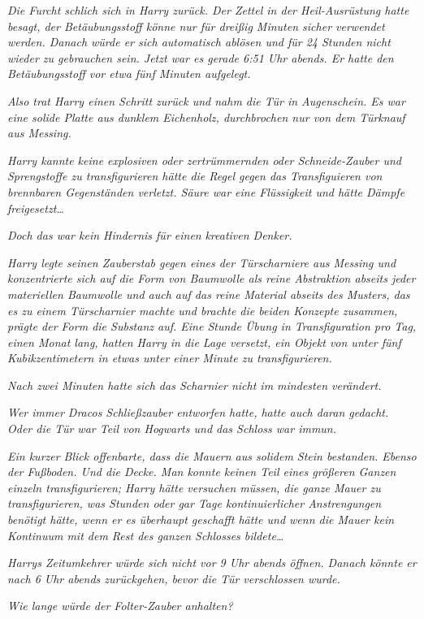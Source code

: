 {\emph{Die Furcht schlich sich in Harry zurück. Der Zettel in der Heil-Ausrüstung hatte besagt, der Betäubungsstoff könne nur für dreißig Minuten sicher verwendet werden. Danach würde er sich automatisch ablösen und für 24 Stunden nicht wieder zu gebrauchen sein. Jetzt war es gerade 6:51 Uhr abends. Er hatte den Betäubungsstoff vor etwa fünf Minuten aufgelegt.}

\emph{Also trat Harry einen Schritt zurück und nahm die Tür in Augenschein. Es war eine solide Platte aus dunklem Eichenholz, durchbrochen nur von dem Türknauf aus Messing.}

\emph{Harry kannte keine explosiven oder zertrümmernden oder Schneide-Zauber und Sprengstoffe zu transfigurieren hätte die Regel gegen das Transfiguieren von brennbaren Gegenständen verletzt. Säure war eine Flüssigkeit und hätte Dämpfe freigesetzt…}

\emph{Doch das war kein Hindernis für einen} \emph{\emph{kreativen Denker.}}

\emph{Harry legte seinen Zauberstab gegen eines der Türscharniere aus Messing und konzentrierte sich auf die Form von Baumwolle als reine Abstraktion abseits jeder materiellen Baumwolle und auch auf das reine Material abseits des Musters, das es zu einem Türscharnier machte und brachte die beiden Konzepte zusammen, prägte der Form die Substanz auf. Eine Stunde Übung in Transfiguration pro Tag, einen Monat lang, hatten Harry in die Lage versetzt, ein Objekt von unter fünf Kubikzentimetern in etwas unter einer Minute zu transfigurieren.}

\emph{Nach zwei Minuten hatte sich das Scharnier nicht im mindesten verändert.}

\emph{Wer immer Dracos Schließzauber entworfen hatte, hatte auch daran gedacht. Oder die Tür war Teil von Hogwarts und das Schloss war immun.}

\emph{Ein kurzer Blick offenbarte, dass die Mauern aus solidem Stein bestanden. Ebenso der Fußboden. Und die Decke. Man konnte keinen Teil eines größeren Ganzen einzeln transfigurieren; Harry hätte versuchen müssen, die ganze Mauer zu transfigurieren, was Stunden oder gar Tage kontinuierlicher Anstrengungen benötigt hätte, wenn er es überhaupt geschafft hätte und wenn die Mauer kein Kontinuum mit dem Rest des ganzen Schlosses bildete…}

\emph{Harrys Zeitumkehrer würde sich nicht vor 9 Uhr abends öffnen. Danach könnte er nach 6 Uhr abends zurückgehen, bevor die Tür verschlossen wurde.}

\emph{Wie lange würde der Folter-Zauber anhalten?}

}
